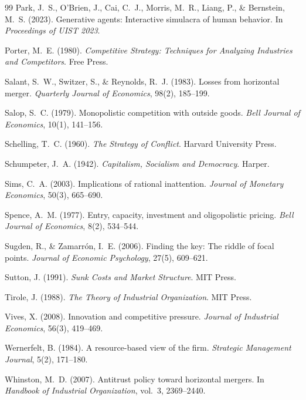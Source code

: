\documentclass[11pt]{article}
\begin{document}
\begin{thebibliography}{99}
Park, J.~S., O'Brien, J., Cai, C.~J., Morris, M.~R., Liang, P., \& Bernstein, M.~S. (2023).
\newblock Generative agents: Interactive simulacra of human behavior.
\newblock In \emph{Proceedings of UIST 2023}.

Porter, M.~E. (1980).
\newblock \emph{Competitive Strategy: Techniques for Analyzing Industries and Competitors}.
\newblock Free Press.

Salant, S.~W., Switzer, S., \& Reynolds, R.~J. (1983).
\newblock Losses from horizontal merger.
\newblock \emph{Quarterly Journal of Economics}, 98(2), 185--199.

Salop, S.~C. (1979).
\newblock Monopolistic competition with outside goods.
\newblock \emph{Bell Journal of Economics}, 10(1), 141--156.

Schelling, T.~C. (1960).
\newblock \emph{The Strategy of Conflict}.
\newblock Harvard University Press.

Schumpeter, J.~A. (1942).
\newblock \emph{Capitalism, Socialism and Democracy}.
\newblock Harper.

Sims, C.~A. (2003).
\newblock Implications of rational inattention.
\newblock \emph{Journal of Monetary Economics}, 50(3), 665--690.

Spence, A.~M. (1977).
\newblock Entry, capacity, investment and oligopolistic pricing.
\newblock \emph{Bell Journal of Economics}, 8(2), 534--544.

Sugden, R., \& Zamarr\'on, I.~E. (2006).
\newblock Finding the key: The riddle of focal points.
\newblock \emph{Journal of Economic Psychology}, 27(5), 609--621.

Sutton, J. (1991).
\newblock \emph{Sunk Costs and Market Structure}.
\newblock MIT Press.

Tirole, J. (1988).
\newblock \emph{The Theory of Industrial Organization}.
\newblock MIT Press.

Vives, X. (2008).
\newblock Innovation and competitive pressure.
\newblock \emph{Journal of Industrial Economics}, 56(3), 419--469.

Wernerfelt, B. (1984).
\newblock A resource-based view of the firm.
\newblock \emph{Strategic Management Journal}, 5(2), 171--180.

Whinston, M.~D. (2007).
\newblock Antitrust policy toward horizontal mergers.
\newblock In \emph{Handbook of Industrial Organization}, vol.~3, 2369--2440.

\end{thebibliography}
\end{document}
